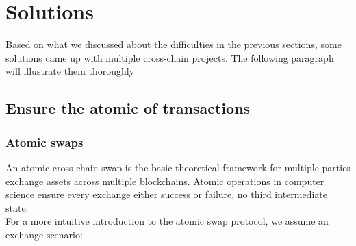 \section{Solutions}
\label{sec:sol}
\noindent Based on what we discussed about the difficulties in the previous sections, some solutions came up with multiple cross-chain projects. The following paragraph will illustrate them thoroughly
\subsection{Ensure the atomic of transactions}

\subsubsection{Atomic swaps}
\noindent An atomic cross-chain swap\cite{herlihy2018atomic} is the basic theoretical framework for multiple parties exchange assets across multiple blockchains. Atomic operations in computer science ensure every exchange either success or failure, no third intermediate state.\\
\noindent For a more intuitive introduction to the atomic swap protocol, we assume an exchange scenario:

